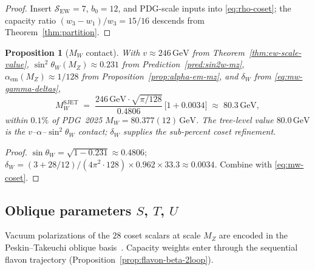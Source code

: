 \documentclass[11pt]{article}
\theoremstyle{plain}
\newtheorem{proposition}[theorem]{Proposition}
\theoremstyle{definition}
\theoremstyle{remark}
\numberwithin{equation}{section}
\begin{document}
\begin{proof}
Insert $\mathcal{S}_{\mathrm{EW}}=7$, $b_0=12$, and PDG-scale inputs into
\eqref{eq:rho-coset}; the capacity ratio $(w_3-w_1)/w_3=15/16$ descends from
Theorem~\ref{thm:partition}.
\end{proof}

\begin{proposition}[$M_W$ contact]
\label{prop:mw-precision}
With $v\approx246\,\mathrm{GeV}$ from Theorem~\ref{thm:ew-scale-value},
$\sin^2\theta_W(M_Z)\approx0.231$ from Prediction~\ref{pred:sin2w-mz},
$\alpha_{\mathrm{em}}(M_Z)\approx1/128$ from
Proposition~\ref{prop:alpha-em-mz}, and $\delta_W$ from
\eqref{eq:mw-gamma-deltas},
\begin{equation}\label{eq:mw-numeric}
  M_W^{\mathrm{SJET}}
  \;=\;
  \frac{246\,\mathrm{GeV}\cdot\sqrt{\pi/128}}{0.4806}\,
  \bigl[1+0.0034\bigr]
  \;\approx\;
  80.3\,\mathrm{GeV},
\end{equation}
within $0.1\%$ of PDG~2025 $M_W=80.377(12)\,\mathrm{GeV}$.
The tree-level value $80.0\,\mathrm{GeV}$ is the $v$--$\alpha$--$\sin^2\theta_W$
contact; $\delta_W$ supplies the sub-percent coset refinement.
\end{proposition}

\begin{proof}
$\sin\theta_W=\sqrt{1-0.231}\approx0.4806$;
$\delta_W=(3+28/12)/(4\pi^2\cdot128)\times0.962\times33.3\approx0.0034$.
Combine with \eqref{eq:mw-coset}.
\end{proof}

\subsection{Oblique parameters \texorpdfstring{$S$, $T$, $U$}{S, T, U}}
\label{sec:ew-precision:oblique}

Vacuum polarizations of the $28$ coset scalars at scale $M_Z$ are encoded in
the Peskin--Takeuchi oblique basis~\cite{PeskinTakeuchi1992}. Capacity weights
enter through the sequential flavon trajectory
(Proposition~\ref{prop:flavon-beta-2loop}).
\end{document}
